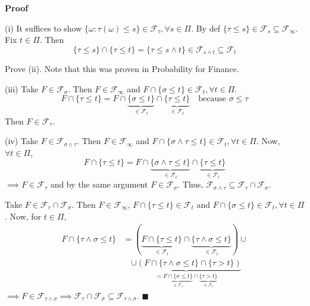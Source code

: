 
\textbf{Proof}

(i) It suffices to show $\{\omega: \tau(\omega) \leq s\} \in \mathcal{F}_{\tau}, \forall s \in \Pi$.
By def $\{\tau \leq s\} \in \mathcal{F}_s \subseteq \mathcal{F}_{\infty}$. Fix $t \in \Pi$. Then
$$\{\tau \leq s\} \cap \{\tau \leq t\} = \{\tau \leq s \wedge t\} \in \mathcal{F}_{s \wedge t} \subseteq \mathcal{F}_t$$

\begin{homework}
    Prove (ii). Note that this was proven in Probability for Finance.
\end{homework}


(iii) Take $F \in \mathcal{F}_{\sigma}$. Then $F \in \mathcal{F}_{\infty}$ and $F \cap \{\sigma \leq t\} \in \mathcal{F}_t, \forall t \in \Pi$.
$$F \cap \{\tau \leq t\} = F \cap \underbrace{\{\sigma \leq t\}}_{\in \mathcal{F}_t} \cap \underbrace{\{\tau \leq t\}}_{\in \mathcal{F}_t} \quad \text{because } \sigma \leq \tau$$
Then $F \in \mathcal{F}_{\tau}$.

(iv) Take $F \in \mathcal{F}_{\sigma \wedge \tau}$. Then $F \in \mathcal{F}_{\infty}$ and $F \cap \{\sigma \wedge \tau \leq t\} \in \mathcal{F}_t, \forall t \in \Pi$. Now, $\forall t \in \Pi$,
$$F \cap \{\tau \leq t\} = F \cap \underbrace{\{\sigma \wedge \tau \leq t\}}_{\in \mathcal{F}_t} \cap \underbrace{\{\tau \leq t\}}_{\in \mathcal{F}_t}$$
$\implies F \in \mathcal{F}_{\tau}$ and by the same argument $F \in \mathcal{F}_{\sigma}$.
Thus, $\mathcal{F}_{\sigma \wedge \tau} \subseteq \mathcal{F}_{\tau} \cap \mathcal{F}_{\sigma}$.

Take $F \in \mathcal{F}_{\tau} \cap \mathcal{F}_{\sigma}$. Then $F \in \mathcal{F}_{\infty}$, $F \cap \{\tau \leq t\} \in \mathcal{F}_t$ and $F \cap \{\sigma \leq t\} \in \mathcal{F}_t, \forall t \in \Pi$. Now, for $t \in \Pi$,
\begin{align*}
F \cap \{\tau \wedge \sigma \leq t\} &= ( \underbrace{F \cap \{\tau \leq t\}}_{\in \mathcal{F}_t} \cap \underbrace{\{\tau \wedge \sigma \leq t\}}_{\in \mathcal{F}_t} ) \cup {} \\
&\quad \underbrace{\cup (F \cap \{\tau \wedge \sigma \leq t\} \cap \{\tau > t\})}_{= \underbrace{F \cap \{\sigma \leq t\}}_{\in \mathcal{F}_t} \cap \underbrace{\{\tau > t\}}_{\in \mathcal{F}_t}}
\end{align*}
$\implies F \in \mathcal{F}_{\tau \wedge \sigma} \implies \mathcal{F}_{\tau} \cap \mathcal{F}_{\sigma} \subseteq \mathcal{F}_{\tau \wedge \sigma}$. $\blacksquare$


